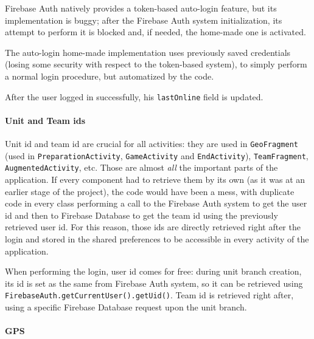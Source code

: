 			Firebase Auth natively provides a token-based auto-login feature, but its implementation is buggy; after the Firebase Auth system initialization, its attempt to perform it is blocked and, if needed, the home-made one is activated.
			
			The auto-login home-made implementation uses previously saved credentials (losing some security with respect to the token-based system), to simply perform a normal login procedure, but automatized by the code.
			
			After the user logged in successfully, his \lstinline|lastOnline| field is updated.
			
			\paragraph{Unit and Team ids}
			
			Unit id and team id are crucial for all activities: they are used in \lstinline|GeoFragment| (used in \lstinline|PreparationActivity|, \lstinline|GameActivity| and \lstinline|EndActivity|), \lstinline|TeamFragment|, \lstinline|AugmentedActivity|, etc. Those are almost \emph{all} the important parts of the application.
			If every component had to retrieve them by its own (as it was at an earlier stage of the project), the code would have been a mess, with duplicate code in every class performing a call to the Firebase Auth system to get the user id and then to Firebase Database to get the team id using the previously retrieved user id.
			For this reason, those ids are directly retrieved right after the login and stored in the shared preferences to be accessible in every activity of the application.
			
			When performing the login, user id comes for free: during unit branch creation, its id is set as the same from Firebase Auth system, so it can be retrieved using \lstinline|FirebaseAuth.getCurrentUser().getUid()|.
			Team id is retrieved right after, using a specific Firebase Database request upon the unit branch.
			
			\paragraph{GPS}
			
